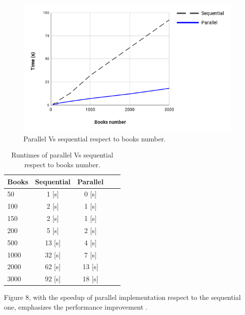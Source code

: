 \documentclass[10pt,twocolumn,letterpaper]{article}
\begin{document}
\begin{figure}[H]
\begin{center}
\includegraphics[width=\columnwidth]{template/latex/parVSseq.png}
\caption{Parallel Vs sequential respect to books number.}
\label{fig:short}
\end{center}
\end{figure}

\begin{table}[H]
\begin{center}
\begin{tabular}{|l|c|c|c|c|}
\hline
Books & Sequential & Parallel\\
\hline\hline
50 & 1 [s] & 0 [s]\\
100 & 2 [s] & 1 [s]\\
150 & 2 [s] & 1 [s]\\
200 & 5 [s] & 2 [s]\\
500 & 13 [s] & 4 [s]\\
1000 & 32 [s] & 7 [s]\\
2000 & 62 [s] & 13 [s]\\
3000 & 92 [s] & 18 [s]\\
\hline
\end{tabular}
\end{center}
\caption{Runtimes of parallel Vs sequential respect to books number.}
\end{table}

\begin{minipage}[H]{8.6cm}
Figure 8, with the speedup of parallel implementation respect to the sequential one, emphasizes the performance improvement .
\end{minipage}
\end{document}
